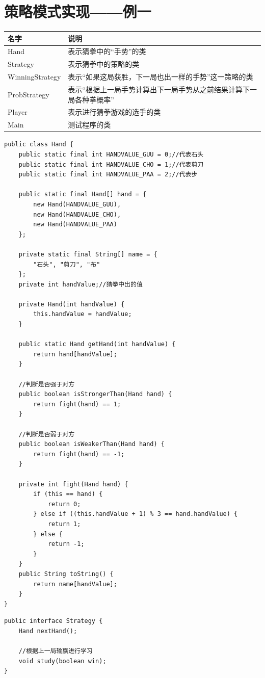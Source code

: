 \section{策略模式实现——例一}
\begin{table}
	\begin{tabular}{|l|l|}
		\hline
		名字&说明\\
		\hline
		Hand&表示猜拳中的“手势”的类\\
		\hline
		Strategy&表示猜拳中的策略的类\\
		\hline
		WinningStrategy&表示“如果这局获胜，下一局也出一样的手势”这一策略的类\\
		\hline
		ProbStrategy&表示“根据上一局手势计算出下一局手势从之前结果计算下一局各种拳概率”\\
		\hline
		Player&表示进行猜拳游戏的选手的类\\
		\hline
		Main&测试程序的类\\
		\hline
	\end{tabular}
\end{table}
\begin{lstlisting}
public class Hand {
	public static final int HANDVALUE_GUU = 0;//代表石头
	public static final int HANDVALUE_CHO = 1;//代表剪刀
	public static final int HANDVALUE_PAA = 2;//代表步

	public static final Hand[] hand = {
		new Hand(HANDVALUE_GUU),
		new Hand(HANDVALUE_CHO),
		new Hand(HANDVALUE_PAA)
	};
	
	private static final String[] name = {
		"石头", "剪刀", "布"
	};
	private int handValue;//猜拳中出的值
	
	private Hand(int handValue) {
		this.handValue = handValue;
	}
	
	public static Hand getHand(int handValue) {
		return hand[handValue];
	}
	
	//判断是否强于对方
	public boolean isStrongerThan(Hand hand) {
		return fight(hand) == 1;
	}
	
	//判断是否弱于对方
	public boolean isWeakerThan(Hand hand) {
		return fight(hand) == -1;
	}
	
	private int fight(Hand hand) {
		if (this == hand) {
			return 0;
		} else if ((this.handValue + 1) % 3 == hand.handValue) {
			return 1;
		} else {
			return -1;
		}
	}
	public String toString() {
		return name[handValue];
	}
}
\end{lstlisting}
\begin{lstlisting}
public interface Strategy {
	Hand nextHand();
	
	//根据上一局输赢进行学习
	void study(boolean win);
}
\end{lstlisting}
